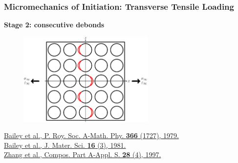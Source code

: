 \documentclass[first,firstsupp,lastsupp,last,hyperref,table]{ETHclass}
\begin{document}
\begin{frame}
\frametitle{\vspace{0.2cm}\small Micromechanics of Initiation: Transverse Tensile Loading}
\vspace{-0.5cm}
\centering
\begin{alertblock}{\centering\scriptsize\bf Stage 2: consecutive debonds}
\vspace{-0.25cm}
\begin{figure}
\centering
\includegraphics[width=0.6\textwidth]{stage2-critdebonds.pdf}
\end{figure}
\end{alertblock}
\vspace{-0.5cm}
\pgfmathsetmacro{}
\pgfmathsetmacro{}
{\fontsize{\fontsizeref}{\stretchref} \selectfont \href{https://doi.org/10.1098/rspa.1979.0071}{Bailey et al., P. Roy. Soc. A-Math. Phy. \textbf{366} (1727), 1979.}}\\\vspace{-5pt}
{\fontsize{\fontsizeref}{\stretchref} \selectfont \href{https://doi.org/10.1007/BF00552203}{Bailey et al., J. Mater. Sci. \textbf{16} (3), 1981.}}\\\vspace{-5pt}
{\fontsize{\fontsizeref}{\stretchref} \selectfont \href{https://doi.org/10.1016/S1359-835X(96)00123-6}{Zhang et al., Compos. Part A-Appl. S. \textbf{28} (4), 1997.}}
\end{frame}

\addtocounter{framenumber}{-1}
\end{document}

